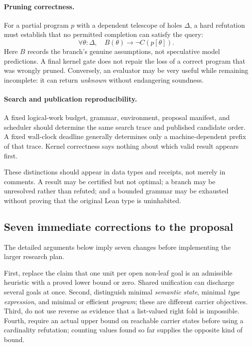 \documentclass[11pt,a4paper]{article}
\theoremstyle{definition}
\theoremstyle{remark}
\begin{document}
\paragraph{Pruning correctness.}
For a partial program $p$ with a dependent telescope of holes $\Delta$, a hard
refutation must establish that no permitted completion can satisfy the query:
\begin{equation}\label{eq:refutation}
 \forall\theta:\Delta,\quad B(\theta)\longrightarrow\neg C(p[\theta]).
\end{equation}
Here $B$ records the branch's genuine assumptions, not speculative model
predictions. A final kernel gate does not repair the loss of a correct program
that was wrongly pruned. Conversely, an evaluator may be very useful while
remaining incomplete: it can return \emph{unknown} without endangering
soundness.

\paragraph{Search and publication reproducibility.}
A fixed logical-work budget, grammar, environment, proposal manifest, and
scheduler should determine the same search trace and published candidate
order. A fixed wall-clock deadline generally determines only a
machine-dependent prefix of that trace. Kernel correctness says nothing about
which valid result appears first.

These distinctions should appear in data types and receipts, not merely in
comments. A result may be certified but not optimal; a branch may be unresolved
rather than refuted; and a bounded grammar may be exhausted without proving
that the original Lean type is uninhabited.

\subsection{Seven immediate corrections to the proposal}
The detailed arguments below imply seven changes before implementing the
larger research plan.

First, replace the claim that one unit per open non-leaf goal is an admissible
heuristic with a proved lower bound or zero. Shared unification can discharge
several goals at once. Second, distinguish minimal \emph{semantic state},
minimal \emph{type expression}, and minimal or efficient \emph{program}; these
are different carrier objectives. Third, do not use reverse as evidence that
a list-valued right fold is impossible. Fourth, require an actual upper bound
on reachable carrier states before using a cardinality refutation; counting
values found so far supplies the opposite kind of bound.
\end{document}
